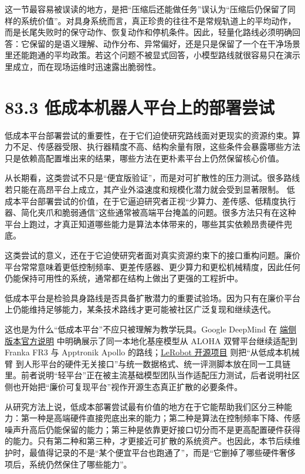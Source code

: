 这一节最容易被误读的地方，是把“压缩后还能做任务”误认为“压缩后仍保留了同样的系统价值”。对具身系统而言，真正珍贵的往往不是常规轨道上的平均动作，而是长尾失败时的保守动作、恢复动作和停机条件。因此，轻量化路线必须明确回答：它保留的是语义理解、动作分布、异常偏好，还是只是保留了一个在干净场景里还能跑通的平均政策。若这个问题不被显式回答，小模型路线就很容易只在演示里成立，而在现场运维时迅速露出脆弱性。

\section*{83.3 低成本机器人平台上的部署尝试}


低成本平台部署尝试的重要性，在于它们迫使研究路线面对更现实的资源约束。算力不足、传感器受限、执行器精度不高、结构余量有限，这些条件会暴露哪些方法只是依赖高配置堆出来的结果，哪些方法在更朴素平台上仍然保留核心价值。

从长期看，这类尝试不只是“便宜版验证”，而是对可扩散性的压力测试。很多路线若只能在高昂平台上成立，其产业外溢速度和规模化潜力就会受到显著限制。 低成本平台部署尝试的价值，在于它逼迫研究者正视“少算力、差传感、低精度执行器、简化夹爪和脆弱通信”这些通常被高端平台掩盖的问题。很多方法只有在这种平台上跑过，才真正知道哪些能力是算法本体带来的，哪些其实依赖昂贵硬件兜底。

这类尝试的意义，还在于它迫使研究者面对真实资源约束下的接口重构问题。廉价平台常常意味着更低控制频率、更差传感器、更少算力和更松机械精度，因此任何仍能保持可用性的系统，通常都在结构上做出了更强的工程折中。

低成本平台是检验具身路线是否具备扩散潜力的重要试验场。因为只有在廉价平台上仍能维持足够能力，某条技术路线才更可能被社区广泛复现和继续迭代。

这也是为什么“低成本平台”不应只被理解为教学玩具。Google DeepMind 在 \href{https://deepmind.google/blog/gemini-robotics-on-device-brings-ai-to-local-robotic-devices/}{端侧版本官方说明} 中明确展示了同一本地化基座模型从 ALOHA 双臂平台继续适配到 Franka FR3 与 Apptronik Apollo 的路线；\href{https://github.com/huggingface/lerobot}{LeRobot 开源项目} 则把“从低成本机械臂 \texttt{} 到人形平台的硬件无关接口”与统一数据格式、统一评测脚本放在同一工具链里。前者说明“轻平台”正在被主流基础模型团队当作适配压力测试，后者说明社区侧也开始把“廉价可复现平台”视作开源生态真正扩散的必要条件。

从研究方法上说，低成本部署尝试最有价值的地方在于它能帮助我们区分三种能力：第一种是高端硬件直接兜底出来的能力；第二种是算法在控制频率下降、传感噪声升高后仍能保留的能力；第三种是依靠更好接口切分而不是更高配置硬件获得的能力。只有第二种和第三种，才更接近可扩散的系统资产。也因此，本节后续维护时，最值得记录的不是“某个便宜平台也跑通了”，而是“它删掉了哪些硬件奢侈项后，系统仍然保住了哪些能力”。


